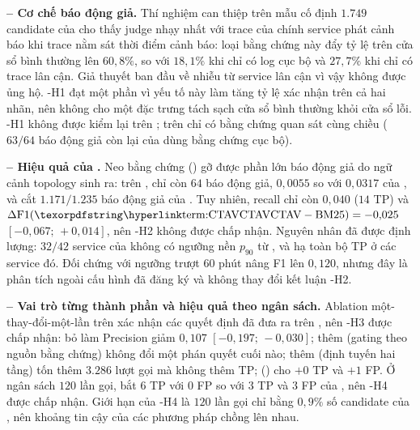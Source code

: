 \textbf{ -- Cơ chế báo động giả.}
Thí nghiệm can thiệp trên mẫu cố định $1.749$ candidate của  cho thấy judge nhạy nhất với trace của chính service phát cảnh báo khi trace nằm sát thời điểm cảnh báo: loại bằng chứng này đẩy tỷ lệ  trên cửa sổ bình thường lên $60{,}8\%$, so với $18{,}1\%$ khi chỉ có log cục bộ và $27{,}7\%$ khi chỉ có trace lân cận. Giả thuyết ban đầu về nhiễu từ service lân cận vì vậy không được ủng hộ. \hyp{H1} đạt một phần vì yếu tố này làm tăng tỷ lệ xác nhận trên cả hai nhãn, nên không cho một đặc trưng tách sạch cửa sổ bình thường khỏi cửa sổ lỗi. \hyp{H1} không được kiểm lại trên ; trên  chỉ có bằng chứng quan sát cùng chiều ($63/64$ báo động giả còn lại của \CTAV{} dùng bằng chứng cục bộ). %

\textbf{ -- Hiệu quả của \CTAV{}.}
Neo bằng chứng () gỡ được phần lớn báo động giả do ngữ cảnh topology sinh ra: trên , \CTAV{} chỉ còn $64$ báo động giả,  $0{,}0055$ so với $0{,}0317$ của , và cắt $1.171/1.235$ báo động giả của . Tuy nhiên, recall chỉ còn $0{,}040$ ($14$ TP) và $\Delta\text{F1}(\text{\CTAV}-\text{BM25}) = -0{,}025$ $[-0{,}067;\, +0{,}014]$, nên \hyp{H2} không được chấp nhận. Nguyên nhân đã được định lượng: $32/42$ service của  không có ngưỡng nền $p_{90}$ từ , và  hạ toàn bộ TP ở các service đó. Đối chứng  với ngưỡng trượt $60$ phút nâng F1 lên $0{,}120$, nhưng đây là phân tích ngoài cấu hình đã đăng ký và không thay đổi kết luận \hyp{H2}. %

\textbf{ -- Vai trò từng thành phần và hiệu quả theo ngân sách.}
Ablation một-thay-đổi-một-lần trên  xác nhận các quyết định đã đưa ra trên , nên \hyp{H3} được chấp nhận: bỏ  làm Precision giảm $0{,}107$ $[-0{,}197;\, -0{,}030]$; thêm  (gating theo nguồn bằng chứng) không đổi một phán quyết cuối nào; thêm  (định tuyến hai tầng) tốn thêm $3.286$ lượt gọi mà không thêm TP;  () cho $+0$ TP và $+1$ FP. Ở ngân sách $120$ lần gọi, \CTAV{} bắt $6$ TP với $0$ FP so với $3$ TP và $3$ FP của , nên \hyp{H4} được chấp nhận. Giới hạn của \hyp{H4} là $120$ lần gọi chỉ bằng $0{,}9\%$ số candidate của , nên khoảng tin cậy của các phương pháp chồng lên nhau. %

